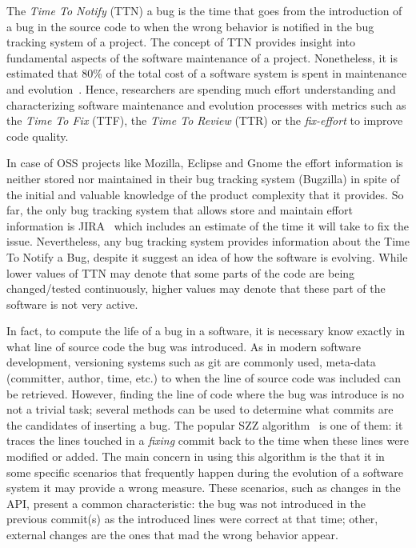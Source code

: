 \documentclass[10pt, conference]{IEEEtran}
\begin{document}
The \emph{Time To Notify} (TTN) a bug is the time that goes from the introduction of a bug in the source code to when the wrong behavior is notified in the bug tracking system of a project. The concept of TTN provides insight into fundamental aspects of the software maintenance of a project. Nonetheless, it is estimated that 80\% of the total cost of a software system is spent in maintenance and evolution~\cite{tassey2002economic}. Hence, researchers are spending much effort understanding and characterizing software maintenance and evolution processes with metrics such as the \emph{Time To Fix} (TTF), the \emph{Time To Review} (TTR) or the \emph{fix-effort} to improve code quality. 

In case of OSS projects like Mozilla, Eclipse and Gnome the effort information is neither stored nor maintained in their bug tracking system (Bugzilla) in spite of the initial and valuable knowledge of the product complexity that it provides. So far, the only bug tracking system that allows store and maintain effort information is JIRA~\cite{weiss2007long} which includes an estimate of the time it will take to fix the issue. Nevertheless, any bug tracking system provides information about the Time To Notify a Bug, despite it suggest an idea of how the software is evolving. While lower values of TTN may denote that some parts of the code are being changed/tested continuously, higher values may denote that these part of the software is not very active.


In fact, to compute the life of a bug in a software, it is necessary know exactly in what line of source code the bug was introduced. As in modern software development, versioning systems such as git are commonly used, meta-data (committer, author, time, etc.) to when the line of source code was included can be retrieved. However, finding the line of code where the bug was introduce is no not a trivial task; several methods can be used to determine what commits are the candidates of inserting a bug. The popular SZZ algorithm~\cite{sliwerski2005changes} is one of them: it traces the lines touched in a \emph{fixing} commit back to the time when these lines were modified or added. The main concern in using this algorithm is the that it in some specific scenarios that frequently happen during the evolution of a software system it may provide a wrong measure. These scenarios, such as changes in the API, present a common characteristic: the bug was not introduced in the previous commit(s) as the introduced lines were correct at that time; other, external changes are the ones that mad the wrong behavior appear. 
\end{document}
